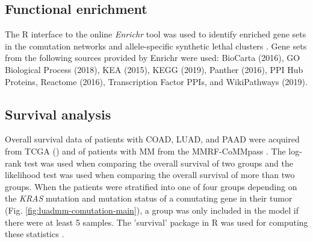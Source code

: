 \documentclass[english, 10pt, letterpaper]{article}
\newcommand{\KRAS}{\emph{KRAS}}
\begin{document}
\subsection*{Functional enrichment}
The R interface to the online \emph{Enrichr} tool was used to identify enriched gene sets in the comutation networks and allele-specific synthetic lethal clusters \cite{Chen2013, Kuleshov2016Enrichr:Update., R-enrichR}.
Gene sets from the following sources provided by Enrichr were used: BioCarta (2016), GO Biological Process (2018), KEA (2015), KEGG (2019), Panther (2016), PPI Hub Proteins, Reactome (2016), Transcription Factor PPIs, and WikiPathways (2019).


\subsection*{Survival analysis}
Overall survival data of patients with COAD, LUAD, and PAAD were acquired from TCGA (\cite{CancerGenomeAtlasNetwork2012, CancerGenomeAtlasResearchNetwork2014, CancerGenomeAtlasResearchNetwork.Electronicaddress:andrew_aguirredfci.harvard.edu2017}) and of patients with MM from the MMRF-CoMMpass \cite{Walker2019AAnalysis.}.
The log-rank test was used when comparing the overall survival of two groups and the likelihood test was used when comparing the overall survival of more than two groups.
When the patients were stratified into one of four groups depending on the \KRAS{} mutation and mutation status of a comutating gene in their tumor (Fig. \ref{fig:luadmm-comutation-main}), a group was only included in the model if there were at least 5 samples.
The 'survival' package in R was used for computing these statistics \cite{survival-package}.
\end{document}
